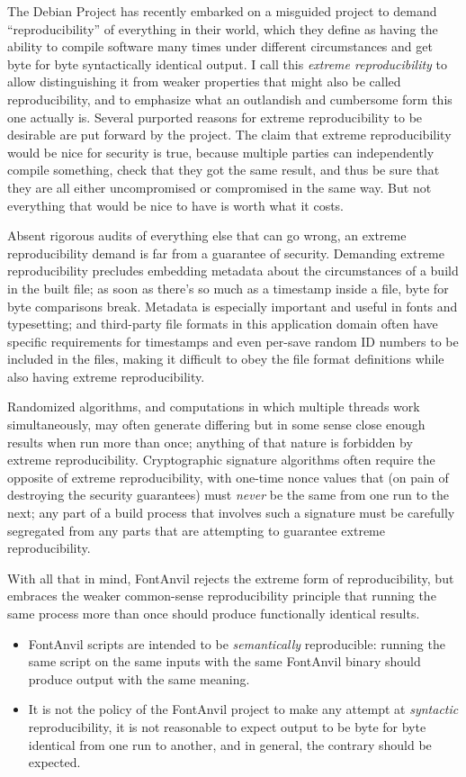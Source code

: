 The Debian Project has recently embarked on a misguided project to demand
``reproducibility'' of everything in their world, which they define as
having the ability to compile software many times under different
circumstances and get byte for byte syntactically identical output.  I call
this \emph{extreme reproducibility} to allow distinguishing it from weaker
properties that might also be called reproducibility, and to emphasize what
an outlandish and cumbersome form this one actually is.  Several purported
reasons for extreme reproducibility to be desirable are put forward by the
project.  The claim that extreme reproducibility would be nice for security
is true, because multiple parties can independently compile something, check
that they got the same result, and thus be sure that they are all either
uncompromised or compromised in the same way.  But not everything that would
be nice to have is worth what it costs.

Absent rigorous audits of everything else that can go wrong, an extreme
reproducibility demand is far from a guarantee of security.  Demanding
extreme reproducibility precludes embedding metadata about the circumstances
of a build in the built file; as soon as there's so much as a timestamp
inside a file, byte for byte comparisons break.  Metadata is especially
important and useful in fonts and typesetting; and third-party file formats
in this application domain often have specific requirements for timestamps
and even per-save random ID numbers to be included in the files, making it
difficult to obey the file format definitions while also having extreme
reproducibility.

Randomized algorithms, and computations in which multiple threads work
simultaneously, may often generate differing but in some sense close enough
results when run more than once; anything of that nature is forbidden by
extreme reproducibility.  Cryptographic signature algorithms often require
the opposite of extreme reproducibility, with one-time nonce values that (on
pain of destroying the security guarantees) must \emph{never} be the same
from one run to the next; any part of a build process that involves such a
signature must be carefully segregated from any parts that are attempting to
guarantee extreme reproducibility.

With all that in mind, FontAnvil rejects the extreme form of
reproducibility, but embraces the weaker common-sense reproducibility
principle that running the same process more than once should produce
functionally identical results.

\begin{itemize}
\item FontAnvil scripts are intended to be \emph{semantically} reproducible:
running the same script on the same inputs with the same FontAnvil binary
should produce output with the same meaning.
\item It is not the policy of the FontAnvil project to make any attempt
at \emph{syntactic} reproducibility, it is not reasonable to expect
output to be byte for byte identical from one run to another, and in
general, the contrary should be expected.
\end{itemize}
